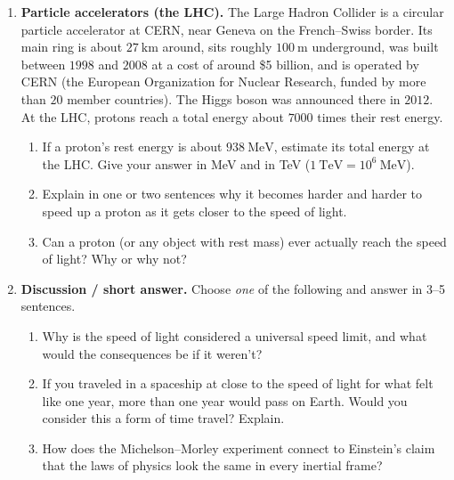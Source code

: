 \documentclass[12pt, twoside]{article}
\begin{document}
\begin{enumerate}[itemsep=0.5cm]
\item \textbf{Particle accelerators (the LHC).} The Large Hadron Collider is a circular particle accelerator at CERN, near Geneva on the French--Swiss border. Its main ring is about $27~\text{km}$ around, sits roughly $100~\text{m}$ underground, was built between $1998$ and $2008$ at a cost of around \$5 billion, and is operated by CERN (the European Organization for Nuclear Research, funded by more than $20$ member countries). The Higgs boson was announced there in $2012$. At the LHC, protons reach a total energy about $7000$ times their rest energy.

  \begin{enumerate}[itemsep=1cm]
    \item If a proton's rest energy is about $938~\text{MeV}$, estimate its total energy at the LHC. Give your answer in MeV and in TeV ($1~\text{TeV} = 10^{6}~\text{MeV}$).
    \item Explain in one or two sentences why it becomes harder and harder to speed up a proton as it gets closer to the speed of light.
    \item Can a proton (or any object with rest mass) ever actually reach the speed of light? Why or why not?
  \end{enumerate}
  \vspace{0.2cm}

\item \textbf{Discussion / short answer.} Choose \emph{one} of the following and answer in 3--5 sentences.
  \begin{enumerate}[itemsep=0pt, parsep=0pt, topsep=0pt]
    \item Why is the speed of light considered a universal speed limit, and what would the consequences be if it weren't?
    \item If you traveled in a spaceship at close to the speed of light for what felt like one year, more than one year would pass on Earth. Would you consider this a form of time travel? Explain.
    \item How does the Michelson--Morley experiment connect to Einstein's claim that the laws of physics look the same in every inertial frame?
  \end{enumerate}

\end{enumerate}
\end{document}
